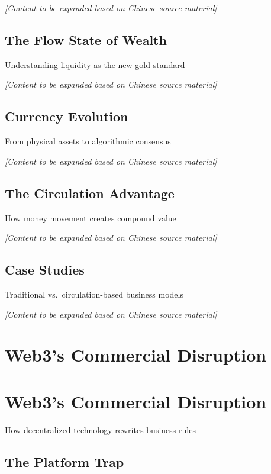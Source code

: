 \documentclass[
  Letterpaper,
]{scrbook}
\begin{document}
\emph{{[}Content to be expanded based on Chinese source material{]}}

\section{The Flow State of Wealth}\label{the-flow-state-of-wealth}

Understanding liquidity as the new gold standard

\emph{{[}Content to be expanded based on Chinese source material{]}}

\section{Currency Evolution}\label{currency-evolution}

From physical assets to algorithmic consensus

\emph{{[}Content to be expanded based on Chinese source material{]}}

\section{The Circulation Advantage}\label{the-circulation-advantage}

How money movement creates compound value

\emph{{[}Content to be expanded based on Chinese source material{]}}

\section{Case Studies}\label{case-studies}

Traditional vs.~circulation-based business models

\emph{{[}Content to be expanded based on Chinese source material{]}}

\chapter{Web3's Commercial
Disruption}\label{web3s-commercial-disruption}

\chapter{Web3's Commercial Disruption}\label{sec-web3-disruption}

How decentralized technology rewrites business rules

\section{The Platform Trap}\label{the-platform-trap}
\end{document}
